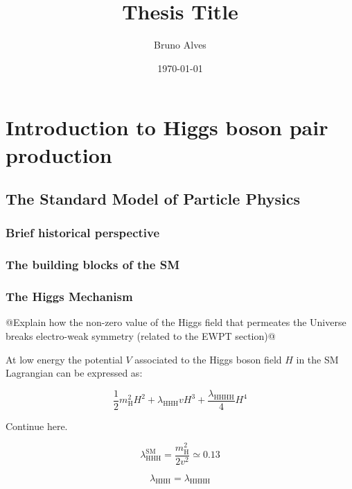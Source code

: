 \documentclass[11pt]{article}
\author{Bruno Alves}
\date{\today}
\title{Thesis Title}
\makeatletter
\renewcommand{\maketitle}{%
  \begingroup\parindent0pt
  \sffamily
  \Huge{\bfseries\@title}\par\bigskip
  \LARGE{\bfseries\@author}\par\medskip
  \normalsize\@date\par\bigskip
  \endgroup\@afterindentfalse\@afterheading}
\newcommand{\klfour}{\lambda_{\text{HHHH}}}
\newcommand{\klthree}{\lambda_{\text{HHH}}}
\newcommand{\mh}{m_{\text{H}}}
\makeatother
\begin{document}
\maketitle
\tableofcontents


\section{Introduction to Higgs boson pair production}
\label{sec:org8f3a301}
\subsection{The Standard Model of Particle Physics}
\label{sec:org39259cb}
\label{sec:SM}
\subsubsection{Brief historical perspective}
\label{sec:org147ee97}
\subsubsection{The building blocks of the SM}
\label{sec:orga9e0daa}
\subsubsection{The Higgs Mechanism}
\label{sec:orgdfd4d61}
\label{sec:HiggsMechanism}

@Explain how the non-zero value of the Higgs field that permeates the Universe breaks electro-weak symmetry (related to the EWPT section)@

At low energy the potential \(V\) associated to the Higgs boson field \(H\) in the SM Lagrangian can be expressed as:

\begin{equation}
\label{eq:sm_potential}
\frac{1}{2}\mh^{2}H^{2} + \klthree{}vH^{3} + \frac{\klfour}{4}H^{4}
\end{equation}

\noindent Continue here.

\begin{equation}
\label{eq:self_coupling}
\klthree^{\text{SM}} = \frac{\mh^{2}}{2v^{2}} \simeq 0.13
\end{equation}

\begin{equation}
\label{eq:dihiggs_coupling_relation}
\klthree = \klfour
\end{equation}
\end{document}
